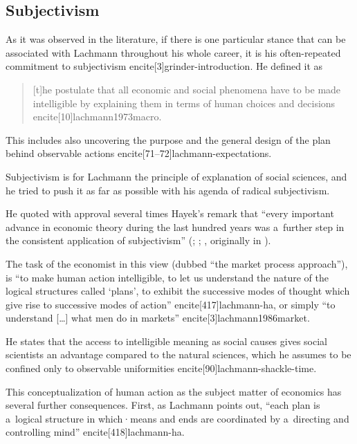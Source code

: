 {\subsection{Subjectivism}





As it was observed in the literature, if there is one particular stance that can be associated with Lachmann throughout his whole career, it is his often-repeated commitment to subjectivism encite[3]{grinder-introduction}. He defined it as

\begin{quote}

[t]he postulate that all economic and social phenomena have to be made intelligible by explaining them in terms of human choices and decisions encite[10]{lachmann1973macro}.

\end{quote}

This includes also uncovering the purpose and the general design of the plan behind observable actions encite[71--72]{lachmann-expectations}.



Subjectivism is for Lachmann the principle of explanation of social sciences, and he tried to push it as far as possible with his agenda of radical subjectivism.

He quoted with approval several times Hayek's remark that ``every important advance in economic theory during the last hundred years was a~further step in the consistent application of subjectivism'' (\cite[155]{lachmann-individualism}; \citeyear[23]{lachmann1986market}; \citeyear[3]{lachmann-shackle-place}, originally in \cite[31]{hayek-counterrevolution}).

The task of the economist in this view (dubbed ``the market process approach''), is ``to make human action intelligible, to let us understand the nature of the logical structures called `plans', to exhibit the successive modes of thought which give rise to successive modes of action'' encite[417]{lachmann-ha}, or simply ``to understand [\ldots] what men do in markets'' encite[3]{lachmann1986market}.

He states that the access to intelligible meaning as social causes gives social scientists an advantage compared to the natural sciences, which he assumes to be confined only to observable uniformities encite[90]{lachmann-shackle-time}.



This conceptualization of human action as the subject matter of economics has several further consequences. First, as Lachmann points out, ``each plan is a~logical structure in which·means and ends are coordinated by a~directing and controlling mind'' encite[418]{lachmann-ha}.

}
